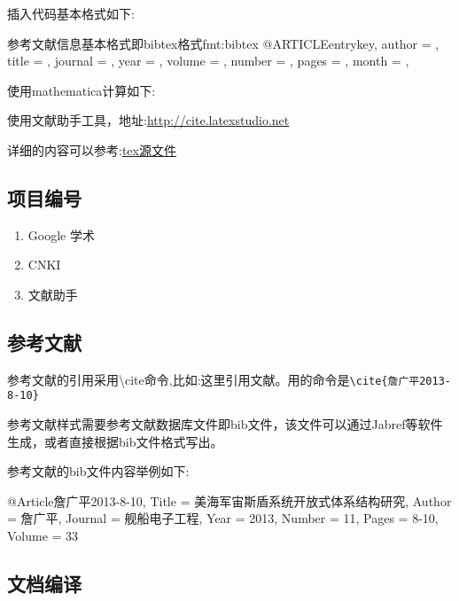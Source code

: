 插入代码基本格式如下:
\begin{codetex}{参考文献信息基本格式即bibtex格式}{fmt:bibtex}
@ARTICLE{entrykey,
  author =       {},
  title =        {},
  journal =      {},
  year =         {},
  volume =       {},
  number =       {},
  pages =        {},
  month =        {},
}
\end{codetex}

使用mathematica计算如下:

使用文献助手工具，地址:\url{http://cite.latexstudio.net}

详细的内容可以参考:\href{run:./code-radar-equation.tex}{tex源文件}

\subsection{项目编号}

\begin{enumerate}
  \item Google 学术
  \item CNKI
  \item 文献助手
\end{enumerate}


\subsection{参考文献}

参考文献的引用采用\textbackslash cite命令,比如:这里引用文献\cite{詹广平2013-8-10}。用的命令是\verb|\cite{詹广平2013-8-10}|

参考文献样式需要参考文献数据库文件即bib文件，该文件可以通过Jabref等软件生成，或者直接根据bib文件格式写出。

参考文献的bib文件内容举例如下:
\begin{texlist}
@Article{詹广平2013-8-10,
  Title                    = {美海军宙斯盾系统开放式体系结构研究},
  Author                   = {詹广平},
  Journal                  = {舰船电子工程},
  Year                     = {2013},
  Number                   = {11},
  Pages                    = {8-10},
  Volume                   = {33}
}
\end{texlist}

\subsection{文档编译}

